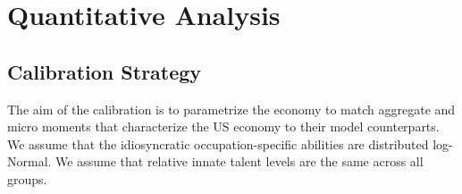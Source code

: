 \documentclass[onehalfspacing,11pt]{article}
\begin{document}
%
%
%
\section{Quantitative Analysis}\label{sec:quant}
\subsection{Calibration Strategy}
The aim of the calibration is to parametrize the economy to match aggregate and micro moments that characterize the US economy to their model counterparts. We assume that the idiosyncratic occupation-specific abilities are distributed log-Normal. We assume that relative innate talent levels are the same across all groups.
\end{document}
